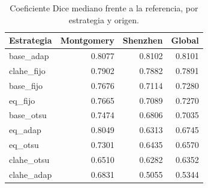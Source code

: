 \begin{table}[H]
\centering
\small
\caption{Coeficiente Dice mediano frente a la referencia, por estrategia y origen.}
\begin{tabular}{lrrr}
\toprule
\textbf{Estrategia} & \textbf{Montgomery} & \textbf{Shenzhen} & \textbf{Global} \\
\midrule
base\_adap & 0.8077 & 0.8102 & 0.8101 \\
clahe\_fijo & 0.7902 & 0.7882 & 0.7891 \\
base\_fijo & 0.7676 & 0.7114 & 0.7280 \\
eq\_fijo & 0.7665 & 0.7089 & 0.7270 \\
base\_otsu & 0.7474 & 0.6806 & 0.7035 \\
eq\_adap & 0.8049 & 0.6313 & 0.6745 \\
eq\_otsu & 0.7301 & 0.6435 & 0.6570 \\
clahe\_otsu & 0.6510 & 0.6282 & 0.6352 \\
clahe\_adap & 0.6831 & 0.5055 & 0.5344 \\
\bottomrule
\end{tabular}
\end{table}
